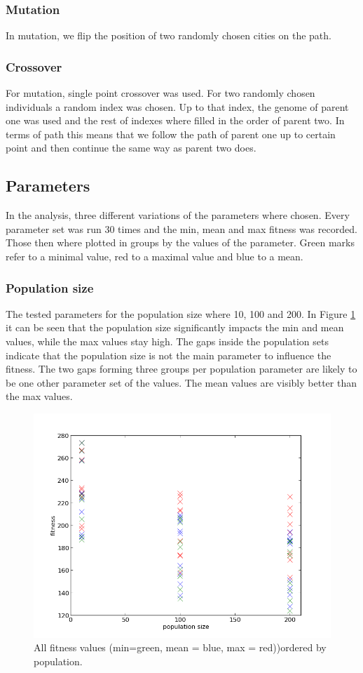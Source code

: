 \documentclass{scrartcl}
\begin{document}
\subsubsection{Mutation}
In mutation, we flip the position of two randomly chosen cities on the path.

\subsubsection{Crossover}
For mutation, single point crossover was used. For two randomly chosen individuals a random index was chosen. Up to that index, the genome of parent one was used and the rest of indexes where filled in the order of parent two. In terms of path this means that we follow the path of parent one up to certain point and then continue the same way as parent two does.

\subsection{Parameters}
In the analysis, three different variations of the parameters where chosen. Every parameter set was run 30 times and the min, mean and max fitness was recorded. Those then where plotted in groups by the values of the parameter. Green marks refer to a minimal value, red to a maximal value and blue to a mean.


\subsubsection{Population size}
The tested parameters for the population size where 10, 100 and 200.
In Figure \ref{fig:tsppop} it can be seen that the population size significantly impacts the min and mean values, while the max values stay high. The gaps inside the population sets indicate that the population size is not the main parameter to influence the fitness. The two gaps forming three groups per population parameter are likely to be one other parameter set of the values. The mean values are visibly better than the max values.

\begin{figure}
 \center
 \includegraphics[width=.5\linewidth]{img/ex3/tsp_fitness_population.png} 
 \caption{All fitness values (min=green, mean = blue, max = red))ordered by population.}
 \label{fig:tsppop}
\end{figure}
\end{document}
